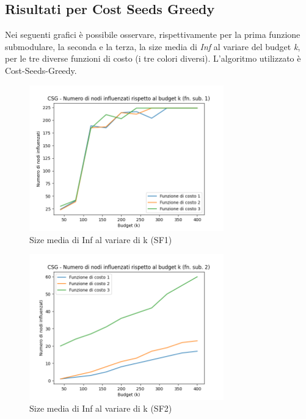 \subsection{Risultati per Cost Seeds Greedy}

Nei seguenti grafici è possibile osservare, rispettivamente per la prima funzione submodulare, la seconda e la terza, la size media di \textit{Inf} al variare del budget \textit{k}, per le tre diverse funzioni di costo (i tre colori diversi). L'algoritmo utilizzato è Cost-Seeds-Greedy.

\begin{figure}[hbtp]
    \centering
    \includegraphics[width=0.75\textwidth]{images/csg_submodular_function_0.png}
    \caption*{Size media di Inf al variare di k (SF1)}
    \label{fig:first}
\end{figure}

\begin{figure}[hbtp]
    \centering
    \includegraphics[width=0.75\textwidth]{images/csg_submodular_function_1.png}
    \caption*{Size media di Inf al variare di k (SF2)}
    \label{fig:second}
\end{figure}

